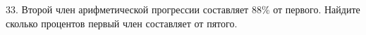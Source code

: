 33. Второй член арифметической прогрессии составляет $88\%$ от первого. Найдите сколько процентов первый член составляет от пятого.\\
